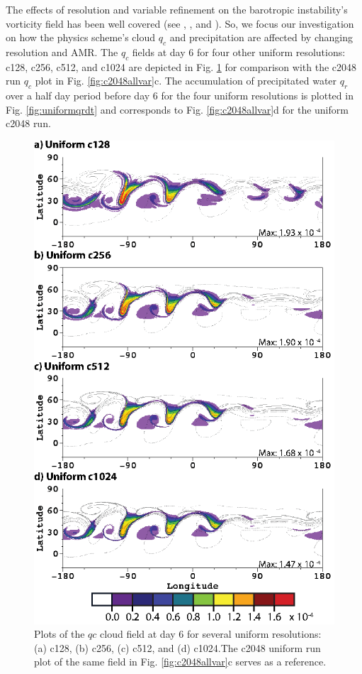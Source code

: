 The effects of resolution and variable refinement on the barotropic instability's vorticity
field has been well covered (see \cite{st2007comparison}, \cite{Weller:2009gl}, 
and \cite{scott2016test}). So, we focus our investigation on how the physics
scheme's cloud $q_c$ and precipitation are affected by changing resolution
and AMR. The $q_c$ fields at day 6 for four other uniform resolutions: c128, c256, c512, and
c1024 are depicted in Fig. \ref{fig:uniformqc} for comparison with the c2048 run $q_c$ plot 
in Fig. \ref{fig:c2048allvar}c. The accumulation of precipitated water $q_r$ over
a half day period before day 6 for the four uniform resolutions is plotted in Fig. \ref{fig:uniformqrdt}
and corresponds to Fig. \ref{fig:c2048allvar}d for the uniform c2048 run.

\begin{figure}
   \centerline{%
   \noindent
   \includegraphics[width=\textwidth,height=\textheight,keepaspectratio]{Chap2/A_qc_uniform-01}}
   \caption{Plots of the $qc$ cloud field at day 6 for several 
   uniform resolutions: (a) c128, (b) c256, (c) c512, and (d) c1024.The c2048 uniform run
   plot of the same field in Fig. \ref{fig:c2048allvar}c serves as a reference.
   }
   \label{fig:uniformqc}
\end{figure}

